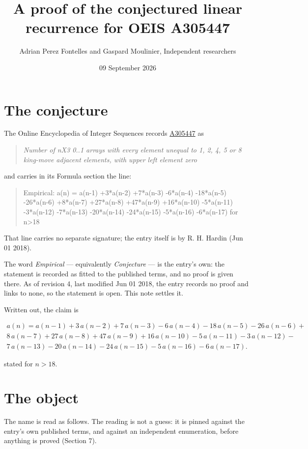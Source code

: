 \documentclass[11pt]{article}
\title{A proof of the conjectured linear recurrence for OEIS A305447}
\author{Adrian Perez Fontelles and Gaspard Moulinier, Independent researchers}
\date{09 September 2026}
\theoremstyle{definition}
\begin{document}
\maketitle
\section{The conjecture}

The Online Encyclopedia of Integer Sequences records \href{https://oeis.org/A305447}{A305447} as

\begin{quote}\itshape Number of nX3 0..1 arrays with every element unequal to 1, 2, 4, 5 or 8 king-move adjacent elements, with upper left element zero\end{quote}

and carries in its Formula section the line:

\begin{quote}\ttfamily Empirical: a(n) = a(n-1) +3*a(n-2) +7*a(n-3) -6*a(n-4) -18*a(n-5) -26*a(n-6) +8*a(n-7) +27*a(n-8) +47*a(n-9) +16*a(n-10) -5*a(n-11) -3*a(n-12) -7*a(n-13) -20*a(n-14) -24*a(n-15) -5*a(n-16) -6*a(n-17) for n>18\end{quote}

That line carries no separate signature; the entry itself is by R. H. Hardin (Jun 01 2018).

The word {\itshape Empirical} --- equivalently {\itshape Conjecture} --- is the entry's own: the statement is recorded as fitted to the published terms, and no proof is given there. As of revision 4, last modified Jun 01 2018, the entry records no proof and links to none, so the statement is open. This note settles it.

Written out, the claim is

\begin{multline*} a(n) = a(n-1) + 3\,a(n-2) + 7\,a(n-3) - 6\,a(n-4) - 18\,a(n-5) - 26\,a(n-6) + \\ 8\,a(n-7) + 27\,a(n-8) + 47\,a(n-9) + 16\,a(n-10) - 5\,a(n-11) - 3\,a(n-12) - \\ 7\,a(n-13) - 20\,a(n-14) - 24\,a(n-15) - 5\,a(n-16) - 6\,a(n-17). \end{multline*}

stated for $n > 18$.

\section{The object}

The name is read as follows. The reading is not a guess: it is pinned against the entry's own published terms, and against an independent enumeration, before anything is proved (Section 7).
\end{document}
